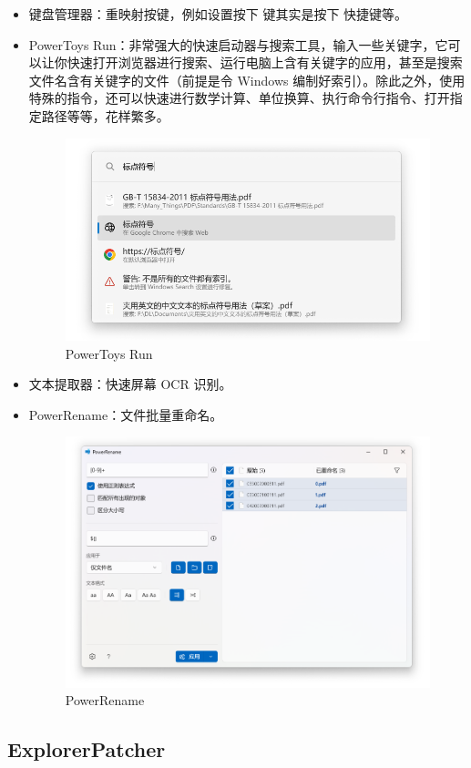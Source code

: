 \begin{itemize}
  \item 键盘管理器：重映射按键，例如设置按下  键其实是按下  快捷键等。
  \item PowerToys Run：非常强大的快速启动器与搜索工具，输入一些关键字，它可以让你快速打开浏览器进行搜索、运行电脑上含有关键字的应用，甚至是搜索文件名含有关键字的文件（前提是令 Windows 编制好索引）。除此之外，使用特殊的指令，还可以快速进行数学计算、单位换算、执行命令行指令、打开指定路径等等，花样繁多。
    \begin{figure}[htb!]
      \centering
      \includegraphics[width=.68\textwidth]{assets/software/Powertoys_Run.png}
      \caption{PowerToys Run}
      \label{fig:PowerToys_Run}
    \end{figure}
  \item 文本提取器：快速屏幕 OCR 识别。
  \item PowerRename：文件批量重命名。
    \begin{figure}[htb!]
      \centering
      \includegraphics[width=.75\textwidth]{assets/software/PowerRename.png}
      \caption{PowerRename}
      \label{fig:PowerRename}
    \end{figure}
\end{itemize}

\subsection{ExplorerPatcher}

